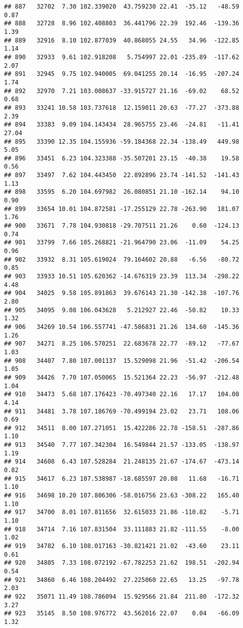 \documentclass[]{article}
\begin{document}
\begin{verbatim}
## 887   32702  7.30 102.339020  43.759230 22.41  -35.12   -48.59  0.87
## 888   32728  8.96 102.408803  36.441796 22.39  192.46  -139.36  1.39
## 889   32916  8.10 102.877039  40.868055 24.55   34.96  -122.85  1.14
## 890   32933  9.61 102.918208   5.754997 22.01 -235.89  -117.62  2.07
## 891   32945  9.75 102.940005  69.041255 20.14  -16.95  -207.24  1.74
## 892   32970  7.21 103.008637 -33.915727 21.16  -69.02    68.52  0.68
## 893   33241 10.58 103.737618  12.159011 20.63  -77.27  -373.88  2.39
## 894   33383  9.09 104.143434  28.965755 23.46  -24.81   -11.41 27.04
## 895   33390 12.35 104.155936 -59.184368 22.34 -138.49   449.98  5.05
## 896   33451  6.23 104.323388 -35.507201 23.15  -40.38    19.58  0.56
## 897   33497  7.62 104.443450  22.892896 23.74 -141.52  -141.43  1.13
## 898   33595  6.20 104.697982  26.080851 21.10 -162.14    94.10  0.90
## 899   33654 10.01 104.872581 -17.255129 22.78 -263.90   181.07  1.76
## 900   33671  7.78 104.930818 -29.707511 21.26    0.60  -124.13  0.74
## 901   33799  7.66 105.268821 -21.964790 23.06  -11.09    54.25  0.96
## 902   33932  8.31 105.619024  79.164602 20.88   -6.56   -80.72  0.85
## 903   33933 10.51 105.620362 -14.676319 23.39  113.34  -298.22  4.48
## 904   34025  9.58 105.891863  39.676143 21.30 -142.38  -107.76  2.80
## 905   34095  9.08 106.043628   5.212927 22.46  -50.82    10.33  1.32
## 906   34269 10.54 106.557741 -47.586831 21.26  134.60  -145.36  1.26
## 907   34271  8.25 106.570251  22.683678 22.77  -89.12   -77.67  1.03
## 908   34407  7.80 107.001137  15.529098 21.96  -51.42  -206.54  1.05
## 909   34426  7.70 107.050065  15.521364 22.23  -56.97  -212.48  1.04
## 910   34473  5.68 107.176423 -70.497340 22.16   17.17   104.08  4.14
## 911   34481  3.78 107.186769 -70.499194 23.02   23.71   108.06  0.69
## 912   34511  8.00 107.271051  15.422286 22.78 -158.51  -287.86  1.10
## 913   34540  7.77 107.342304  16.549844 21.57 -133.05  -138.97  1.19
## 914   34608  6.43 107.528284  21.248135 21.67 -174.67  -473.14  0.82
## 915   34617  6.23 107.538987 -18.685597 20.08   11.68   -16.71  1.10
## 916   34698 10.20 107.806306 -58.016756 23.63 -308.22   165.40  1.10
## 917   34700  8.01 107.811656  32.615033 21.86 -110.82    -5.71  1.10
## 918   34714  7.16 107.831504  33.111883 21.82 -111.55    -8.00  1.02
## 919   34782  6.10 108.017163 -30.821421 21.02  -43.60    23.11  0.61
## 920   34805  7.33 108.072192 -67.782253 21.62  198.51  -202.94  0.54
## 921   34860  6.46 108.204492  27.225060 22.65   13.25   -97.78  2.03
## 922   35071 11.49 108.786094  15.929566 21.84  211.80  -172.32  3.27
## 923   35145  8.50 108.976772  43.562016 22.07    0.04   -66.09  1.32

\end{verbatim}
\end{document}
